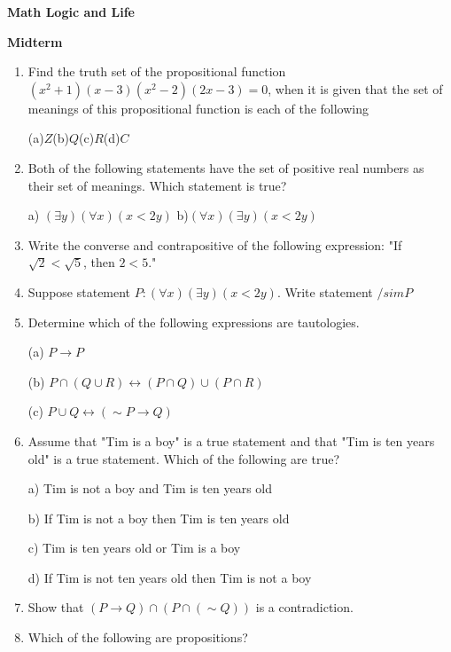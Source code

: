 




\begin{center}
\textbf{\large{Math Logic and Life}}

\textbf{Midterm}
\end{center}

\begin{enumerate}
	\item Find the truth set of the propositional function $(x^2 + 1)(x - 3)(x^2 - 2)(2x - 3) = 0$, when it is given that the set of meanings of this propositional function is each of the following
	
	(a)$Z$(b)$Q$(c)$R$(d)$C$
	
	\item Both of the following statements have the set of positive real numbers as their set of meanings. Which statement is true?
	
	a) $(\exists y)(\forall x)(x < 2y)$ b)$(\forall x)(\exists y)(x < 2y)$
	
	\item Write the converse and contrapositive of the following expression: "If $\sqrt{2} < \sqrt{5}$, then $2 < 5$."
	
	\item Suppose statement $P:(\forall x)(\exists y)(x < 2y)$. Write statement $/sim P$
	
	\item Determine which of the following expressions are tautologies.
	
	(a) $P \rightarrow P$
	
	(b) $P \cap (Q \cup R) \leftrightarrow (P \cap Q) \cup (P \cap R)$
	
	(c) $P \cup Q \leftrightarrow (\sim P \rightarrow Q)$
	\item Assume that "Tim is a boy" is a true statement and that "Tim is ten years old" is a true statement. Which of the following are true?
	
	a) Tim is not a boy and Tim is ten years old
	
	b) If Tim is not a boy then Tim is ten years old
	
	c) Tim is ten years old or Tim is a boy
	
	d) If Tim is not ten years old then Tim is not a boy
	\item Show that $(P \rightarrow Q) \cap (P \cap (\sim Q))$ is a contradiction.
	
	\item Which of the following are propositions?
	

\end{enumerate}
